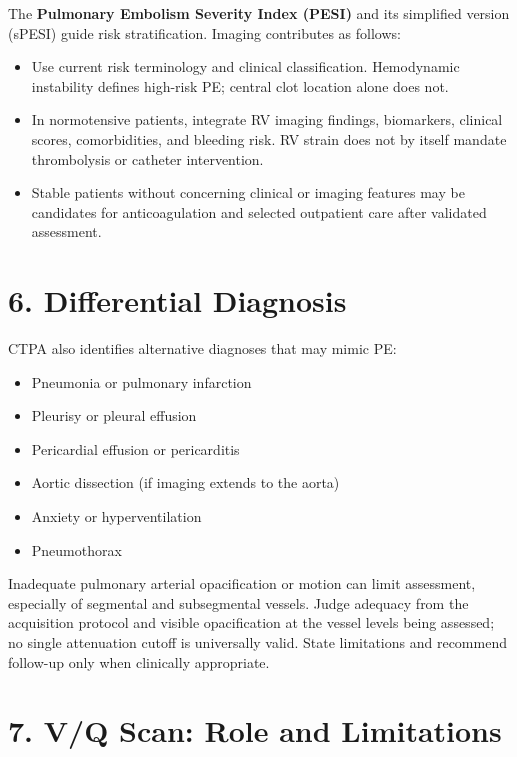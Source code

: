 The \textbf{Pulmonary Embolism Severity Index (PESI)} and its simplified version (sPESI) guide risk stratification. Imaging contributes as follows:

\begin{itemize}
  \item Use current risk terminology and clinical classification. Hemodynamic instability defines high-risk PE; central clot location alone does not.
  \item In normotensive patients, integrate RV imaging findings, biomarkers, clinical scores, comorbidities, and bleeding risk. RV strain does not by itself mandate thrombolysis or catheter intervention.
  \item Stable patients without concerning clinical or imaging features may be candidates for anticoagulation and selected outpatient care after validated assessment.
\end{itemize}

\section{6. Differential Diagnosis}

CTPA also identifies alternative diagnoses that may mimic PE:
\begin{itemize}
  \item Pneumonia or pulmonary infarction
  \item Pleurisy or pleural effusion
  \item Pericardial effusion or pericarditis
  \item Aortic dissection (if imaging extends to the aorta)
  \item Anxiety or hyperventilation
  \item Pneumothorax
\end{itemize}

\begin{pearlbox}
Inadequate pulmonary arterial opacification or motion can limit assessment, especially of segmental and subsegmental vessels. Judge adequacy from the acquisition protocol and visible opacification at the vessel levels being assessed; no single attenuation cutoff is universally valid. State limitations and recommend follow-up only when clinically appropriate.
\end{pearlbox}

\section{7. V/Q Scan: Role and Limitations}

